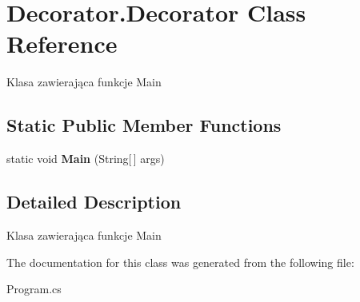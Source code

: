 \hypertarget{class_decorator_1_1_decorator}{}\section{Decorator.\+Decorator Class Reference}
\label{class_decorator_1_1_decorator}


Klasa zawierająca funkcje Main  


\subsection*{Static Public Member Functions}
\begin{DoxyCompactItemize}
\item 
\mbox{\label{class_decorator_1_1_decorator_af259ab736aee14120bdfdb90e64246c6}} 
static void {\bfseries Main} (String\mbox{[}$\,$\mbox{]} args)
\end{DoxyCompactItemize}


\subsection{Detailed Description}
Klasa zawierająca funkcje Main 



The documentation for this class was generated from the following file\+:\begin{DoxyCompactItemize}
\item 
Program.\+cs\end{DoxyCompactItemize}
